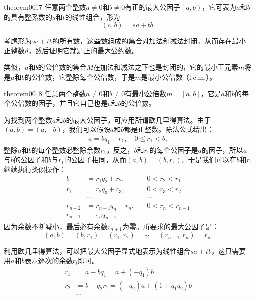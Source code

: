 \begin{theorem}{}{theorem0017}
任意两个整数$a \neq 0$和$b \neq 0$有正的最大公因子$(a, b)$，它可表为$a$和$b$的具有整系数的$s$和$t$的线性组合，形为
\begin{equation}\label{equation0013}
(a,b)=sa+tb.
\end{equation}
\end{theorem}

考虑形为$sa+tb$的所有数，这些数组成的集合对加法和减法封闭，从而存在最小正整数$d$，然后证明它就是正的最大公约数。

类似，$a$和$b$的公倍数的集合$M$在加法和减法之下也是封闭的，它的最小正元素$m$将是$a$和$b$的公倍数，它整除每个公倍数，于是$m$是最小公倍数（l.c.m.）。
\begin{theorem}{}{theorem0018}
任意两个整数$a \neq 0$和$b \neq 0$有最小公倍数$m=[a, b]$，它是$a$和$b$的每个公倍数的因子，并且它自己也是$a$和$b$的公倍数。
\end{theorem}

为找到两个整数$a$和$b$的最大公因子，可应用所谓欧几里得算法。由于$(a, b) = (a, -b)$，我们可以假设$a$和$b$都是正整数。除法公式给出：
\begin{gather}\label{equation0014}
a = bq_1+r_1, \quad 0 \le r_1 < b,
\end{gather}
整除$a$和$b$的每个整数必整除余数$r_1$，反之，$b$和$r_1$的每个公因子是$a$的因子，所以$a$与$b$的公因子和$b$与$r_1$的公因子相同，从而$(a,b)= (b, r_1)$。于是我们可以在$b$和$r_1$继续执行类似操作：
\begin{equation}
\begin{aligned}
b &= r_1q_2 + r_2, \quad  &0 < r_2 < r_1 \\
r_1 &= r_2q_3 + r_3, \quad &0 < r_3 < r_2 \\
&\cdots& \cdots\\
r_{n-2} &= r_{n-1}q_n + r_n, \quad &0 < r_n < r_{n-1}\\
r_{n-1} &= r_nq_{n+1}&
\end{aligned}
\end{equation}
因为余数不断减小，最后必有余数$r_{n+1}$为零。所要求的最大公因子是：
\[
(a, b) = (b, r_1) = (r_1, r_2) = \cdots = (r_{n-1}, r_n) = r_n.
\]

利用欧几里得算法，可以把最大公因子显式地表示为线性组合$sa+tb$，这只需要用$a$和$b$表示逐次的余数$r_i$即可。
\[
\begin{aligned}
r_1 &= a - bq_1 = a + (-q_1)b \\
r_2 &= b - q_2r_1 = (-q_2)a + (1 + q_1q_2)b \\
&\cdots
\end{aligned}
\]

